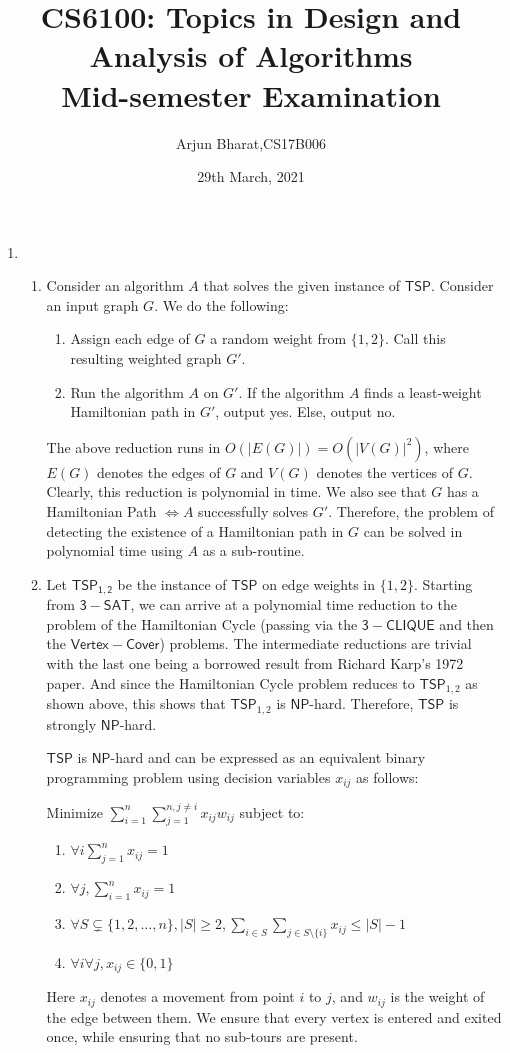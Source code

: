 \documentclass{article}
\author{Arjun Bharat,CS17B006}
\title{CS6100: Topics in Design and Analysis of Algorithms \\ Mid-semester Examination}
\date{29th March, 2021}
\newcommand{\lang}[1]{\mathsf{#1}}
\newcommand{\cc}[1]{\mathsf{#1}}
\begin{document}
	\maketitle
	\begin{enumerate}
		\item \begin{enumerate}
			\item Consider an algorithm $A$ that solves the given instance of $\lang{TSP}$. Consider an input graph $G$. We do the following:
			\begin{enumerate}
				\item Assign each edge of $G$ a random weight from $\{1,2\}$. Call this resulting weighted graph $G'$.
				\item Run the algorithm $A$ on $G'$. If the algorithm $A$ finds a least-weight Hamiltonian path in $G'$, output yes. Else, output no. 
		\end{enumerate}  
	The above reduction runs in $O(|E(G)|) = O({|V(G)|^2})$, where $E(G)$ denotes the edges of $G$ and $V(G)$ denotes the vertices of $G$. Clearly, this reduction is polynomial in time. We also see that $G$ has a Hamiltonian Path $\iff A$ successfully solves $G'$. Therefore, the problem of detecting the existence of a Hamiltonian path in $G$ can be solved in polynomial time using $A$ as a sub-routine.
	
			\item Let $\lang{TSP_{1,2}}$ be the instance of $\lang{TSP}$ on edge weights in $\{1,2\}$. Starting from $\lang{3-SAT}$, we can arrive at a polynomial time reduction to the problem of the Hamiltonian Cycle (passing via the $\lang{3-CLIQUE}$ and then the $\lang{Vertex-Cover}$) problems. The intermediate reductions are trivial with the last one being a borrowed result from Richard Karp's 1972 paper. And since the Hamiltonian Cycle problem reduces to $\lang{TSP}_{1,2}$ as shown above, this shows that $\lang{TSP}_{1,2}$ is $\cc{NP}$-hard. Therefore, $\lang{TSP}$ is strongly $\lang{NP}$-hard.
			
			$\lang{TSP}$ is $\lang{NP}$-hard and can be expressed as an equivalent binary programming problem using decision variables $x_{ij}$ as follows:
			
			Minimize $\sum_{i=1}^{n} \sum_{j=1}^{n,j \neq i} x_{ij}w_{ij}$ subject to:
			\begin{enumerate}
				\item $\forall i \sum_{j=1}^{n}x_{ij} = 1$
				\item $\forall j,\sum_{i=1}^{n}x_{ij} = 1$
				\item $\forall S \subsetneq \{1,2,\ldots,n\},|S| \geq 2, \sum_{i \in S}\sum_{j\in S\setminus\{i\}} x_{ij} \leq |S|-1$
				\item $\forall i\forall j,x_{ij} \in \{0,1\}$ 
			\end{enumerate}
			 Here $x_{ij}$ denotes a movement from point $i$ to $j$, and $w_{ij}$ is the weight of the edge between them. We ensure that every vertex is entered and exited once, while ensuring that no sub-tours are present. 
			 

\end{enumerate}
\end{enumerate}
\end{document}
